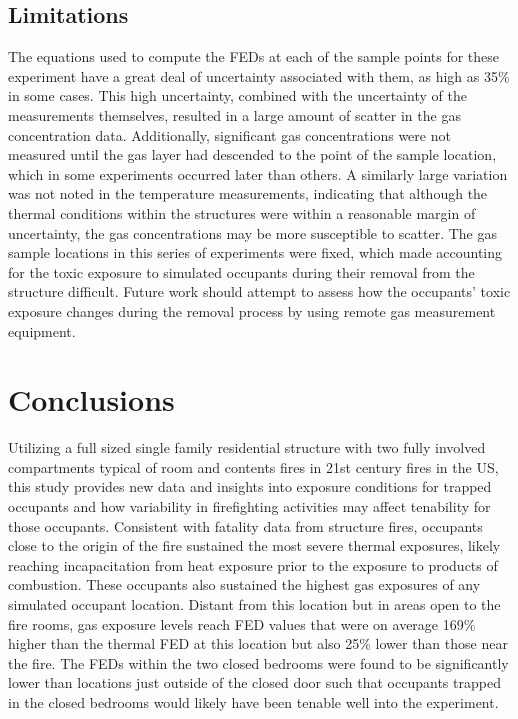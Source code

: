 \documentclass[12pt,oneside]{article}
\begin{document}
\subsection{Limitations}

 The equations used to compute the FEDs at each of the sample points for these experiment have a great deal of uncertainty associated with them, as high as 35\% in some cases. This high uncertainty, combined with the uncertainty of the measurements themselves, resulted in a large amount of scatter in the gas concentration data. Additionally, significant gas concentrations were not measured until the gas layer had descended to the point of the sample location, which in some experiments occurred later than others. A similarly large variation  was not noted in the temperature measurements, indicating that although the thermal conditions within the structures were within a reasonable margin of uncertainty, the gas concentrations may be more susceptible to scatter. The gas sample locations in this series of experiments were fixed, which made accounting for the toxic exposure to simulated occupants during their removal from the structure difficult. Future work should attempt to assess how the occupants' toxic exposure changes during the removal process by using remote gas measurement equipment. 

\section{Conclusions}

Utilizing a full sized single family residential structure with two fully involved compartments typical of room and contents fires in 21st century fires in the US, this study provides new data and insights into exposure conditions for trapped occupants and how variability in firefighting activities may affect tenability for those occupants.  Consistent with fatality data from structure fires, occupants close to the origin of the fire sustained the most severe thermal exposures, likely reaching incapacitation from heat exposure prior to the exposure to products of combustion.  These occupants also sustained the highest gas exposures of any simulated occupant location. Distant from this location but in areas open to the fire rooms, gas exposure levels reach FED values that were on average 169\% higher than the thermal FED at this location but also 25\% lower than those near the fire.  The FEDs within the two closed bedrooms were found to be significantly lower than locations just outside of the closed door such that occupants trapped in the closed bedrooms would likely have been tenable well into the experiment. 
\end{document}
